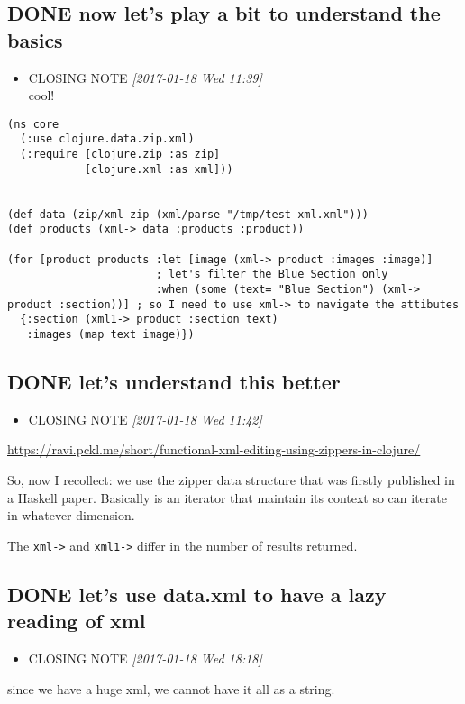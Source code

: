 \documentclass[11pt]{article}
\begin{document}
\subsection{{\bfseries\sffamily DONE} now let's play a bit to understand the basics}
\label{sec:org15d22e1}
\begin{itemize}
\item CLOSING NOTE \textit{[2017-01-18 Wed 11:39] } \\
cool!
\end{itemize}
\begin{verbatim}
(ns core
  (:use clojure.data.zip.xml)
  (:require [clojure.zip :as zip]
            [clojure.xml :as xml]))


(def data (zip/xml-zip (xml/parse "/tmp/test-xml.xml")))
(def products (xml-> data :products :product))

(for [product products :let [image (xml-> product :images :image)]
                       ; let's filter the Blue Section only
                       :when (some (text= "Blue Section") (xml-> product :section))] ; so I need to use xml-> to navigate the attibutes
  {:section (xml1-> product :section text)
   :images (map text image)})
\end{verbatim}

\subsection{{\bfseries\sffamily DONE} let's understand this better}
\label{sec:org66d2365}
\begin{itemize}
\item CLOSING NOTE \textit{[2017-01-18 Wed 11:42]}
\end{itemize}
\url{https://ravi.pckl.me/short/functional-xml-editing-using-zippers-in-clojure/}

So, now I recollect: we use the zipper data structure that was firstly
published in a Haskell paper. Basically is an iterator that maintain
its context so can iterate in whatever dimension.

The \texttt{xml->} and \texttt{xml1->} differ in the number of results returned.

\subsection{{\bfseries\sffamily DONE} let's use data.xml to have a lazy reading of xml}
\label{sec:org6a4d6e0}
\begin{itemize}
\item CLOSING NOTE \textit{[2017-01-18 Wed 18:18]}
\end{itemize}
since we have a huge xml, we cannot have it all as a string.
\end{document}
